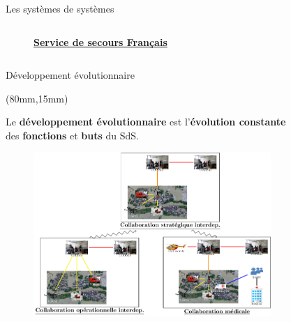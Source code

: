 \begin{frame}{Les systèmes de systèmes}
\begin{columns}
\begin{column}{0.5\textwidth}
\begin{figure}
\caption{\underline{\textbf{Service de secours Français}}}
\end{figure}
\end{column}
\end{columns}
\end{frame}

\begin{frame}{Développement évolutionnaire}

\begin{textblock*}{4.5cm}(80mm,15mm)
\begin{block}{}
Le \textbf{développement évolutionnaire} est l'\textbf{évolution
constante} \\
des \textbf{fonctions} et \textbf{buts} du SdS.
\end{block}
\end{textblock*}

\begin{figure}
\flushleft
\includegraphics[width=9cm]{imgs/dev_evolutionnaire.pdf}
\end{figure}
\end{frame}


